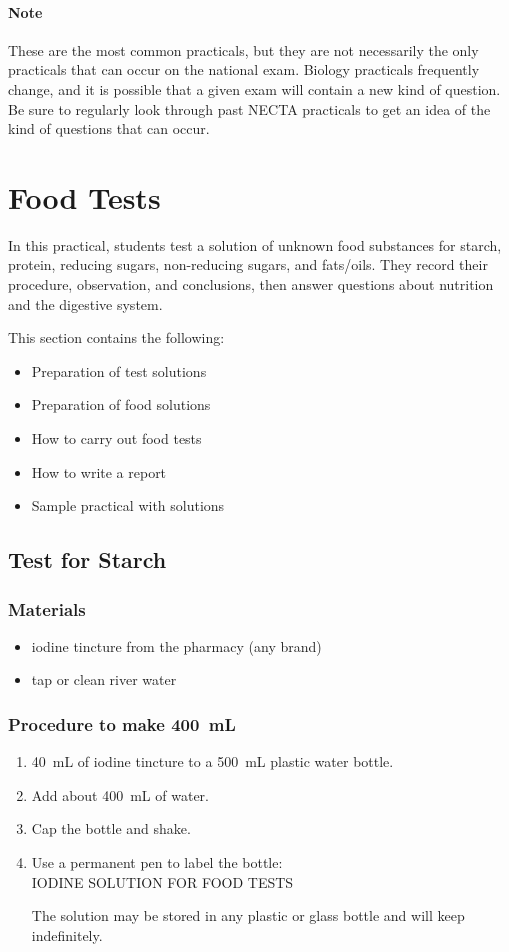 \paragraph{Note} These are the most common practicals, but they are not necessarily the only practicals that can occur on the national exam. Biology practicals frequently change, and it is possible that a given exam will contain a new kind of question. Be sure to regularly look through past NECTA practicals to get an idea of the kind of questions that can occur.

\section{Food Tests}

In this practical, students test a solution of unknown food substances for starch, protein, reducing sugars, non-reducing sugars, and fats\slash oils. They record their procedure, observation, and conclusions, then answer questions about nutrition and the digestive system.

This section contains the following:
\begin{itemize}
\item{Preparation of test solutions}
\item{Preparation of food solutions}
\item{How to carry out food tests}
\item{How to write a report}
\item{Sample practical with solutions}
\end{itemize}

\subsection{Test for Starch}

\subsubsection{Materials}
\begin{itemize}
\item{iodine tincture from the pharmacy (any brand)}
\item{tap or clean river water}
\end{itemize}

\subsubsection{Procedure to make 400~mL}
\begin{enumerate}
\item{40~mL of iodine tincture to a 500~mL plastic water bottle.}
\item{Add about 400~mL of water.}
\item{Cap the bottle and shake.}
\item{Use a permanent pen to label the bottle:\\
IODINE SOLUTION FOR FOOD TESTS}

The solution may be stored in any plastic or glass bottle and will keep indefinitely.
\end{enumerate}

